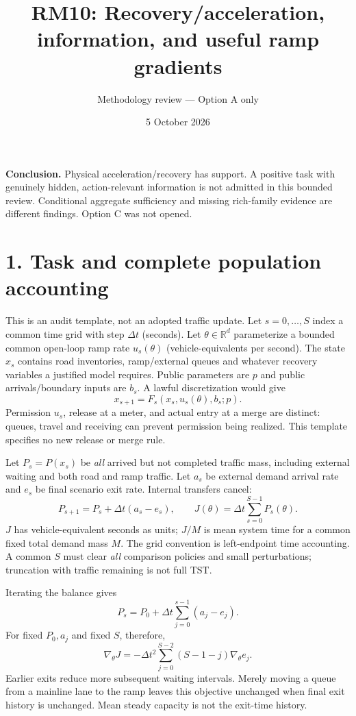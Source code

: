 \documentclass[11pt,a4paper]{article}
\title{RM10: Recovery/acceleration, information, and useful ramp gradients}
\author{Methodology review --- Option A only}
\date{5 October 2026}
\newcommand{\R}{\mathbb R}
\begin{document}
\maketitle
\textbf{Conclusion.} Physical acceleration/recovery has support. A positive task
with genuinely hidden, action-relevant information is not admitted in this bounded
review. Conditional aggregate sufficiency and missing rich-family evidence are
different findings. Option C was not opened.

\section*{1. Task and complete population accounting}
This is an audit template, not an adopted traffic update. Let $s=0,\ldots,S$
index a common time grid with step $\Delta t$ (seconds). Let $\theta\in\R^d$
parameterize a bounded common open-loop ramp rate $u_s(\theta)$ (vehicle-equivalents
per second). The state $x_s$ contains road inventories, ramp/external queues and
whatever recovery variables a justified model requires. Public parameters are
$p$ and public arrivals/boundary inputs are $b_s$. A lawful discretization would give
\[
 x_{s+1}=F_s(x_s,u_s(\theta),b_s;p).
\]
Permission $u_s$, release at a meter, and actual entry at a merge are distinct:
queues, travel and receiving can prevent permission being realized. This template
specifies no new release or merge rule.

Let $P_s=P(x_s)$ be \emph{all} arrived but not completed traffic mass, including
external waiting and both road and ramp traffic. Let $a_s$ be external demand
arrival rate and $e_s$ be final scenario exit rate. Internal transfers cancel:
\begin{equation}
 P_{s+1}=P_s+\Delta t(a_s-e_s),\qquad
 J(\theta)=\Delta t\sum_{s=0}^{S-1}P_s(\theta).
 \label{eq:tst}
\end{equation}
$J$ has vehicle-equivalent seconds as units; $J/M$ is mean system time for a
common fixed total demand mass $M$. The grid convention is left-endpoint time
accounting. A common $S$ must clear \emph{all} comparison policies and small
perturbations; truncation with traffic remaining is not full TST.

Iterating the balance gives
\[
 P_s=P_0+\Delta t\sum_{j=0}^{s-1}(a_j-e_j).
\]
For fixed $P_0,a_j$ and fixed $S$, therefore,
\begin{equation}
 \nabla_\theta J
 =-\Delta t^2\sum_{j=0}^{S-2}(S-1-j)\nabla_\theta e_j.
 \label{eq:exit}
\end{equation}
Earlier exits reduce more subsequent waiting intervals. Merely moving a queue
from a mainline lane to the ramp leaves this objective unchanged when final exit
history is unchanged. Mean steady capacity is not the exit-time history.
\end{document}
